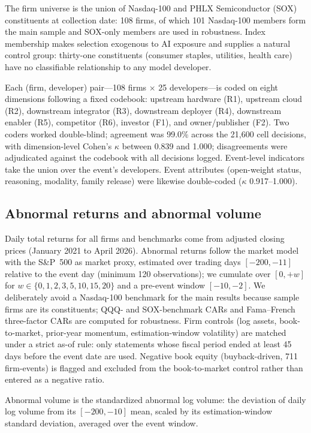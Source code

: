\documentclass[review,12pt,authoryear]{elsarticle}
\begin{document}
The firm universe is the union of Nasdaq-100 and PHLX Semiconductor (SOX)
constituents at collection date: 108 firms, of which 101 Nasdaq-100 members
form the main sample and SOX-only members are used in robustness. Index
membership makes selection exogenous to AI exposure and supplies a natural
control group: thirty-one constituents (consumer staples, utilities, health
care) have no classifiable relationship to any model developer.

Each (firm, developer) pair---108 firms $\times$ 25 developers---is coded on
eight dimensions following a fixed codebook: upstream hardware (R1), upstream
cloud (R2), downstream integrator (R3), downstream deployer (R4), downstream
enabler (R5), competitor (R6), investor (F1), and owner/publisher (F2). Two
coders worked double-blind; agreement was 99.0\% across the 21,600 cell
decisions, with dimension-level Cohen's $\kappa$ between 0.839 and 1.000;
disagreements were adjudicated against the codebook with all decisions logged.
Event-level indicators take the union over the event's developers. Event
attributes (open-weight status, reasoning, modality, family release) were
likewise double-coded ($\kappa$ 0.917--1.000).

\subsection{Abnormal returns and abnormal volume}\label{sec:car}

Daily total returns for all firms and benchmarks come from adjusted closing
prices (January 2021 to April 2026). Abnormal returns follow the market model
with the S\&P~500 as market proxy, estimated over trading days $[-200,-11]$
relative to the event day (minimum 120 observations); we cumulate over
$[0,+w]$ for $w \in \{0,1,2,3,5,10,15,20\}$ and a pre-event window $[-10,-2]$.
We deliberately avoid a Nasdaq-100 benchmark for the main results because
sample firms are its constituents; QQQ- and SOX-benchmark CARs and
Fama--French three-factor CARs are computed for robustness. Firm controls
(log assets, book-to-market, prior-year momentum, estimation-window
volatility) are matched under a strict as-of rule: only statements whose
fiscal period ended at least 45 days before the event date are used. Negative
book equity (buyback-driven, 711 firm-events) is flagged and excluded from the
book-to-market control rather than entered as a negative ratio.

Abnormal volume is the standardized abnormal log volume: the deviation of
daily log volume from its $[-200,-10]$ mean, scaled by its estimation-window
standard deviation, averaged over the event window.
\end{document}
